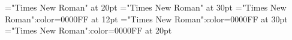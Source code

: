 \documentclass[a4paper]{article}
\begin{document}
 
\pagestyle{plain} 
\sloppy 
\setlength{\parfillskip}{0pt plus 1fil} 
\font\xitemen="Times New Roman" at 20pt
\font\xitempt="Times New Roman" at 30pt
\font\entry="Times New Roman":color=0000FF at 12pt
\font\xitemptentry="Times New Roman":color=0000FF at 30pt
\font\xitemenentry="Times New Roman":color=0000FF at 20pt

\pagestyle{fancy} 

\end{document}
